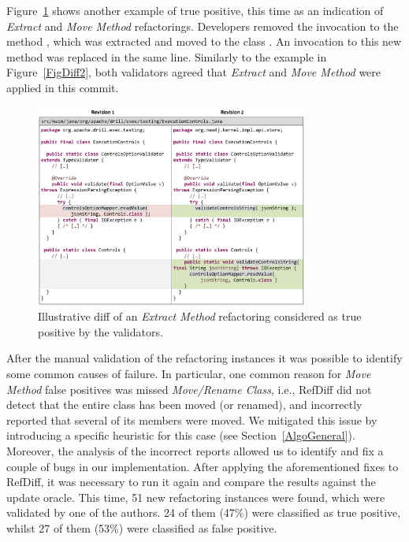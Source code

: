 Figure~\ref{FigDiff3} shows another example of true positive, this time as an indication of \emph{Extract} and \emph{Move Method} refactorings. Developers removed the invocation to the method , which was extracted and moved to the class . An invocation to this new method  was replaced in the same line. Similarly to the example in Figure~\ref{FigDiff2}, both validators agreed that \emph{Extract} and \emph{Move Method} were applied in this commit.

\begin{figure}[htb]
\centering
\includegraphics[width=0.8\textwidth]{img/diff3.pdf}
\caption{Illustrative diff of an \emph{Extract Method} refactoring considered as true positive by the validators.}
\label{FigDiff3}
\end{figure}

After the manual validation of the refactoring instances it was possible to identify some common causes of failure.
In particular, one common reason for \emph{Move Method} false positives was missed \emph{Move/Rename Class}, i.e., RefDiff did not detect that the entire class has been moved (or renamed), and incorrectly reported that several of its members were moved.
We mitigated this issue by introducing a specific heuristic for this case (see Section~\ref{AlgoGeneral}).
Moreover, the analysis of the incorrect reports allowed us to identify and fix a couple of bugs in our implementation.
After applying the aforementioned fixes to RefDiff, it was necessary to run it again and compare the results against the update oracle. This time, 51 new refactoring instances were found, which were  validated by one of the authors. 24 of them (47\%) were classified as true positive, whilst 27 of them (53\%) were classified as false positive.

